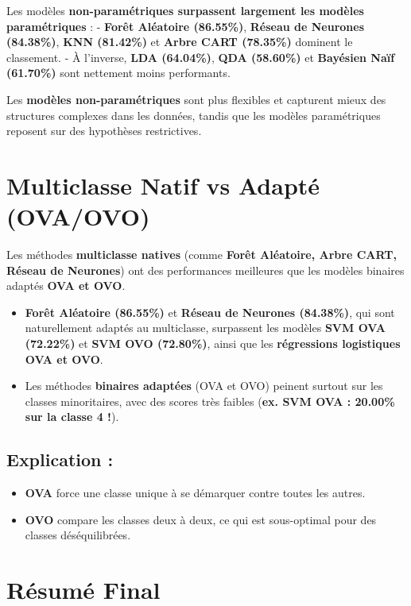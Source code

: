 \documentclass[
]{article}
\providecommand{\tightlist}{%
  \setlength{\itemsep}{0pt}\setlength{\parskip}{0pt}}\usepackage{longtable,booktabs,array}
\begin{document}
Les modèles \textbf{non-paramétriques surpassent largement les modèles
paramétriques} : - \textbf{Forêt Aléatoire (86.55\%)}, \textbf{Réseau de
Neurones (84.38\%)}, \textbf{KNN (81.42\%)} et \textbf{Arbre CART
(78.35\%)} dominent le classement. - À l'inverse, \textbf{LDA
(64.04\%)}, \textbf{QDA (58.60\%)} et \textbf{Bayésien Naïf (61.70\%)}
sont nettement moins performants.

Les \textbf{modèles non-paramétriques} sont plus flexibles et capturent
mieux des structures complexes dans les données, tandis que les modèles
paramétriques reposent sur des hypothèses restrictives.

\section{Multiclasse Natif vs Adapté
(OVA/OVO)}\label{multiclasse-natif-vs-adaptuxe9-ovaovo}

Les méthodes \textbf{multiclasse natives} (comme \textbf{Forêt
Aléatoire, Arbre CART, Réseau de Neurones}) ont des performances
meilleures que les modèles binaires adaptés \textbf{OVA et OVO}.

\begin{itemize}
\tightlist
\item
  \textbf{Forêt Aléatoire (86.55\%)} et \textbf{Réseau de Neurones
  (84.38\%)}, qui sont naturellement adaptés au multiclasse, surpassent
  les modèles \textbf{SVM OVA (72.22\%)} et \textbf{SVM OVO (72.80\%)},
  ainsi que les \textbf{régressions logistiques OVA et OVO}.
\item
  Les méthodes \textbf{binaires adaptées} (OVA et OVO) peinent surtout
  sur les classes minoritaires, avec des scores très faibles
  (\textbf{ex. SVM OVA : 20.00\% sur la classe 4 !}).
\end{itemize}

\subsection{Explication :}\label{explication}

\begin{itemize}
\tightlist
\item
  \textbf{OVA} force une classe unique à se démarquer contre toutes les
  autres.
\item
  \textbf{OVO} compare les classes deux à deux, ce qui est sous-optimal
  pour des classes déséquilibrées.
\end{itemize}

\section{Résumé Final}\label{ruxe9sumuxe9-final}
\end{document}
